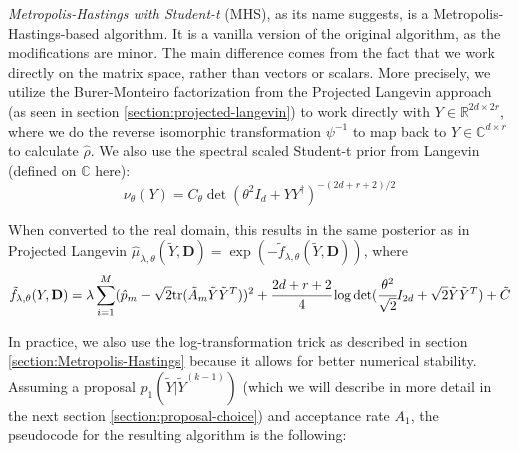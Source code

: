 \documentclass[12pt]{memoir}
\newcommand{\tr}{\text{tr}}
\newcommand{\mb}{\mathbf}
\begin{document}
\textit{Metropolis-Hastings with Student-t} (MHS), as its name suggests, is a Metropolis-Hastings-based algorithm. It is a vanilla version of the original algorithm, as the modifications are minor. The main difference comes from the fact that we work directly on the matrix space, rather than vectors or scalars. More precisely, we utilize the Burer-Monteiro factorization from the Projected Langevin approach (as seen in section \ref{section:projected-langevin}) to work directly with $Y \in \mathbb{R}^{2d \times 2r}$, where we do the reverse isomorphic transformation $\psi^{-1}$ to map back to $Y \in \mathbb{C}^{d\times r}$ to calculate $\hat \rho$. We also use the spectral scaled Student-t prior from Langevin (defined on $\mathbb{C}$ here):
\begin{equation}
    \nu_{\theta} (Y) = C_\theta \det(\theta^2I_d + YY^\dagger)^{-(2d+r+2)/2}
\end{equation}

When converted to the real domain, this results in the same posterior as in Projected Langevin $\hat \mu_{\lambda, \theta}(\tilde Y, \mb D) =\exp(-\tilde f_{\lambda, \theta}(\tilde Y, \mb D))$, where
\begin{equation}
    \tilde f_{\lambda, \theta}(Y, \mb D) = \lambda \sum^{M}_{i=1} (\hat p_m - \sqrt{2}\tr(\tilde A_m \tilde Y \tilde Y^{T}))^2 + \cfrac{2d + r + 2}{4}\log \det(\cfrac{\theta^2}{\sqrt 2}I_{2d} + \sqrt 2 \tilde Y \tilde Y^{T}) + \tilde C
\end{equation}

In practice, we also use the log-transformation trick as described in section \ref{section:Metropolis-Hastings} because it allows for better numerical stability. Assuming a proposal $p_1(\tilde Y|\tilde Y^{(k-1)})$ (which we will describe in more detail in the next section \ref{section:proposal-choice}) and acceptance rate $A_1$, the pseudocode for the resulting algorithm is the following:\medbreak
\end{document}
